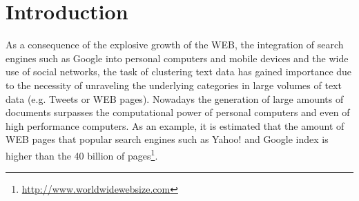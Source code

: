 \documentclass[10pt]{article}
\begin{document}
\section{Introduction}
As a consequence of the explosive growth of the WEB, the integration of search engines such as Google into personal computers and mobile devices and the wide use of social networks, the task of clustering text data has gained importance due to the necessity of unraveling the underlying categories in large volumes of text data (e.g. Tweets or WEB pages). Nowadays the generation of large amounts of documents surpasses the computational power of personal computers and even of high performance computers.
As an example, it is estimated that the amount of WEB pages that popular search engines such as Yahoo! and Google index is higher than the 40 billion of pages\footnote{\url{http://www.worldwidewebsize.com}}.
\end{document}
